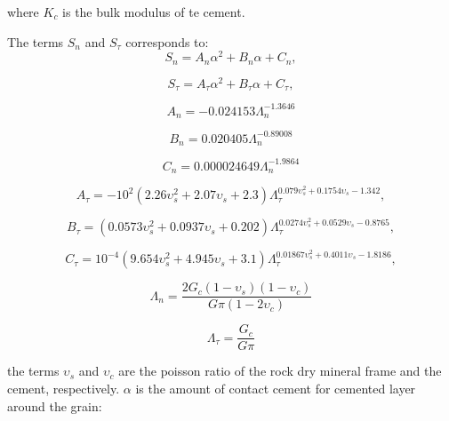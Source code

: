 where $K_{c}$ is the bulk modulus of te cement.

The terms $S_{n}$ and $S_{\tau}$ corresponds to:
\begin{equation}
S_{n}=A_{n}\alpha^2+B_{n}\alpha+C_{n},
  \label{eq:mc}
\end{equation}

\begin{equation}
S_{\tau}=A_{\tau}\alpha^2+B_{\tau}\alpha+C_{\tau},
  \label{eq:mc}
\end{equation}


\begin{equation}
A_{n}=-0.024153\Lambda_{n}^{-1.3646}
  \label{eq:mc}
\end{equation}

\begin{equation}
B_{n}=0.020405\Lambda_{n}^{-0.89008}
  \label{eq:mc}
\end{equation}

\begin{equation}
C_{n}=0.000024649\Lambda_{n}^{-1.9864}
  \label{eq:mc}
\end{equation}


\begin{equation}
A_{\tau}=-10^{2}(2.26\upsilon_{s}^2+2.07\upsilon_{s}+2.3)\Lambda_{\tau}^{0.079\upsilon_{s}^2+0.1754\upsilon_{s}-1.342},
  \label{eq:mc}
\end{equation}

\begin{equation}
B_{\tau}=(0.0573\upsilon_{s}^2+0.0937\upsilon_{s}+0.202)\Lambda_{\tau}^{0.0274\upsilon_{s}^2+0.0529\upsilon_{s}-0.8765},
  \label{eq:mc}
\end{equation}

\begin{equation}
C_{\tau}=10^{-4}(9.654\upsilon_{s}^2+4.945\upsilon_{s}+3.1)\Lambda_{\tau}^{0.01867\upsilon_{s}^2+0.4011\upsilon_{s}-1.8186},
  \label{eq:mc}
\end{equation}


\begin{equation}
\Lambda_{n}=\frac{2G_{c}(1-\upsilon_{s})(1-\upsilon_{c})}{G\pi(1-2\upsilon_{c})}
\label{eq:mc}
\end{equation}

\begin{equation}
\Lambda_{\tau}=\frac{G_{c}}{G\pi}
\label{eq:lambda}
\end{equation}

the terms $\upsilon_{s}$ and $\upsilon_{c}$ are the poisson ratio of the rock dry mineral frame and the cement, 
respectively. $\alpha$ is the amount of contact cement for cemented layer around the grain:


